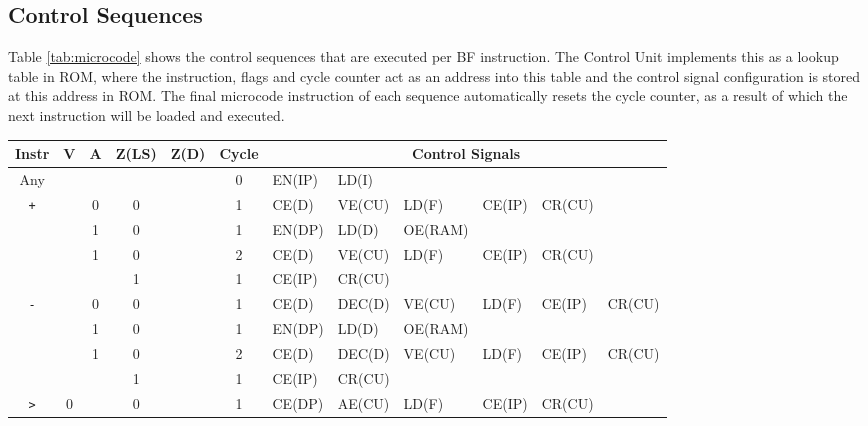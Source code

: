 \subsection{Control Sequences} \label{sec:architecture:sequences}
Table \ref{tab:microcode} shows the control sequences that are executed per BF instruction. The Control Unit implements this as a lookup table in ROM, where the instruction, flags and cycle counter act as an address into this table and the control signal configuration is stored at this address in ROM. The final microcode instruction of each sequence automatically resets the cycle counter, as a result of which the next instruction will be loaded and executed.

\begin{landscape}
  \begin{longtable}[c] {c|cccc|c|llllll}
    Instr      & V & A & Z(LS) & Z(D) & Cycle & \multicolumn{6}{c}{Control Signals}                   \\ \hline
    \rowcolor{White}
    Any        &   &   &       &      & 0     & EN(IP) & LD(I)   &         &        &       &         \\ \hline
    \rowcolor{Gray}
    \texttt{+} &   & 0 & 0     &      & 1     & CE(D)  & VE(CU)  & LD(F)   & CE(IP) & CR(CU) &        \\
    \rowcolor{White}
               &   & 1 & 0     &      & 1     & EN(DP) & LD(D)   & OE(RAM) &        &        &        \\
    \rowcolor{White}
               &   & 1 & 0     &      & 2     & CE(D)  & VE(CU)  & LD(F)   & CE(IP) & CR(CU) &        \\
    \rowcolor{Gray}
               &   &   & 1     &      & 1     & CE(IP) & CR(CU)  &         &        &        &        \\ \hline
    \rowcolor{White}
    \texttt{-} &   & 0 & 0     &      & 1     & CE(D)  & DEC(D)  & VE(CU)  & LD(F)  & CE(IP) & CR(CU) \\
    \rowcolor{Gray}
               &   & 1 & 0     &      & 1     & EN(DP) & LD(D)   & OE(RAM) &        &        &        \\
    \rowcolor{Gray}
               &   & 1 & 0     &      & 2     & CE(D)  & DEC(D)  & VE(CU)  & LD(F)  & CE(IP) & CR(CU) \\
    \rowcolor{White}
               &   &   & 1     &      & 1     & CE(IP) & CR(CU)  &         &        &        &        \\ \hline
    \rowcolor{Gray}
    \texttt{>} & 0 &   & 0     &      & 1     & CE(DP) & AE(CU)  & LD(F)   & CE(IP) & CR(CU) &        \\

\end{longtable}
\end{landscape}
